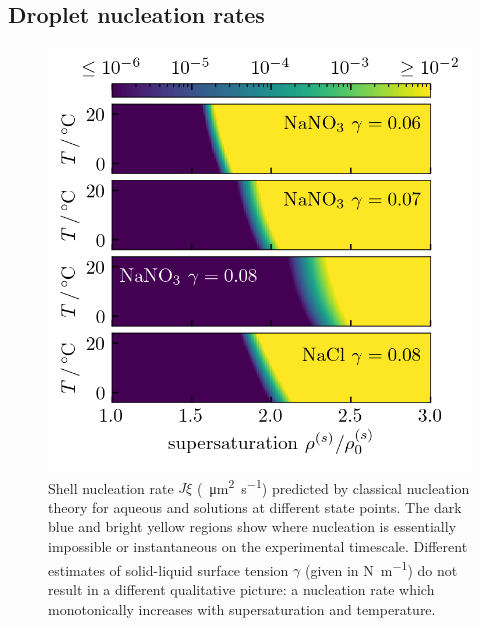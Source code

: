 \documentclass[11pt,twoside]{report}
\begin{document}
\subsection{Droplet nucleation rates}

\begin{figure}
  \includegraphics[width=0.9\linewidth,outer]{aerosol-cnt}
  \caption[Nucleation rates predicted by classical nucleation theory]{
    Shell nucleation rate $J\xi$ (\si{\per\micro\metre\squared\per\second}) predicted by classical nucleation theory for aqueous  and  solutions at different state points.
    The dark blue and bright yellow regions show where nucleation is essentially impossible or instantaneous on the experimental timescale.
    Different estimates of solid-liquid surface tension $\gamma$ (given in \si{\newton\per\metre}) do not result in a different qualitative picture: a nucleation rate which monotonically increases with supersaturation and temperature.}
  \label{fig:cnt}
\end{figure}
\end{document}
